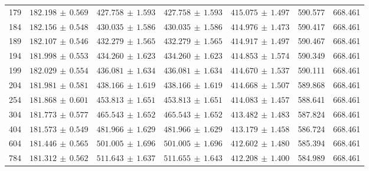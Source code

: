{\begin{longtable}{rrrrrrr}
179 & $182.198\,\pm\,0.569$ & $427.758\,\pm\,1.593$ & $427.758\,\pm\,1.593$ & $415.075\,\pm\,1.497$ & 590.577 & 668.461\\
184 & $182.156\,\pm\,0.548$ & $430.035\,\pm\,1.586$ & $430.035\,\pm\,1.586$ & $414.976\,\pm\,1.473$ & 590.417 & 668.461\\
189 & $182.107\,\pm\,0.546$ & $432.279\,\pm\,1.565$ & $432.279\,\pm\,1.565$ & $414.917\,\pm\,1.497$ & 590.467 & 668.461\\
194 & $181.998\,\pm\,0.553$ & $434.260\,\pm\,1.623$ & $434.260\,\pm\,1.623$ & $414.853\,\pm\,1.574$ & 590.349 & 668.461\\
199 & $182.029\,\pm\,0.554$ & $436.081\,\pm\,1.634$ & $436.081\,\pm\,1.634$ & $414.670\,\pm\,1.537$ & 590.111 & 668.461\\
204 & $181.981\,\pm\,0.581$ & $438.166\,\pm\,1.619$ & $438.166\,\pm\,1.619$ & $414.668\,\pm\,1.507$ & 589.868 & 668.461\\
254 & $181.868\,\pm\,0.601$ & $453.813\,\pm\,1.651$ & $453.813\,\pm\,1.651$ & $414.083\,\pm\,1.457$ & 588.641 & 668.461\\
304 & $181.773\,\pm\,0.577$ & $465.543\,\pm\,1.652$ & $465.543\,\pm\,1.652$ & $413.482\,\pm\,1.483$ & 587.824 & 668.461\\
404 & $181.573\,\pm\,0.549$ & $481.966\,\pm\,1.629$ & $481.966\,\pm\,1.629$ & $413.179\,\pm\,1.458$ & 586.724 & 668.461\\
604 & $181.446\,\pm\,0.565$ & $501.005\,\pm\,1.696$ & $501.005\,\pm\,1.696$ & $412.602\,\pm\,1.480$ & 585.394 & 668.461\\
784 & $181.312\,\pm\,0.562$ & $511.643\,\pm\,1.637$ & $511.655\,\pm\,1.643$ & $412.208\,\pm\,1.400$ & 584.989 & 668.461\\
\end{longtable}
}
